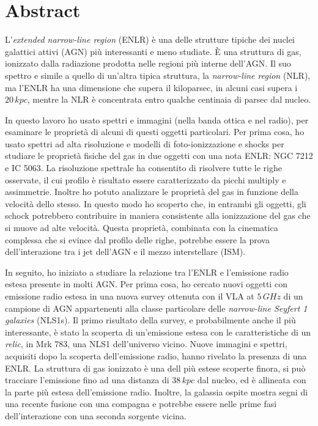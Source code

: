 \documentclass[../main.tex]{subfiles}
\begin{document}
\clearpage

\chapter*{Abstract}

L'\emph{extended narrow-line region} (ENLR) \`e una delle strutture tipiche dei nuclei galattici attivi (AGN) pi\`u interessanti e meno studiate.
\`E una struttura di gas, ionizzato dalla radiazione prodotta nelle regioni pi\`u interne dell'AGN.
Il suo spettro e simile a quello di un'altra tipica struttura, la \emph{narrow-line region} (NLR), ma l'ENLR  ha una dimensione che supera il kiloparsec, in alcuni casi supera i $20\,\si{kpc}$, mentre la NLR \`e concentrata entro qualche centinaia di parsec dal nucleo.

In questo lavoro ho usato spettri e immagini (nella banda ottica e nel radio), per esaminare le propriet\`a di alcuni di questi oggetti particolari.
Per prima cosa, ho usato spettri ad alta risoluzione e modelli di foto-ionizzazione e shocks per studiare le propriet\`a fisiche del gas in due oggetti con una nota ENLR: NGC 7212 e IC 5063.
La risoluzione spettrale ha consentito di risolvere tutte le righe osservate, il cui profilo \`e risultato essere caratterizzato da picchi multiply e assimmetrie.
Inoltre ho potuto analizzare le propriet\`a del gas in funzione della velocit\`a dello stesso.
In questo modo ho scoperto che, in entrambi gli oggetti, gli schock potrebbero contribuire in maniera consistente alla ionizzazione del gas che si muove ad alte velocit\`a.
Questa propriet\`a, combinata con la cinematica complessa che si evince dal profilo delle righe, potrebbe essere la prova dell'interazione tra i jet dell'AGN e il mezzo interstellare (ISM).

In seguito, ho iniziato a studiare la relazione tra l'ENLR e l'emissione radio estesa presente in molti AGN.
Per prima cosa, ho cercato nuovi oggetti con emissione radio estesa in una nuova survey ottenuta con il VLA at $5\,\si{GHz}$ di un campione di AGN appartenenti alla classe particolare delle \emph{narrow-line Seyfert 1 galaxies} (NLS1s).
Il primo risultato della survey, e probabilmente anche il pi\`u interessante, \`e stato la scoperta di un'emissione estesa con le caratteristiche di un \emph{relic}, in Mrk 783, una NLS1 dell'universo vicino.
Nuove immagini e spettri, acquisiti dopo la scoperta dell'emissione radio, hanno rivelato la presenza di una ENLR.
La struttura di gas ionizzato \`e una dell pi\`u estese scoperte finora, si pu\`o tracciare l'emissione fino ad una distanza di $38\,\si{kpc}$ dal nucleo, ed \`e allineata con la parte pi\`u estesa dell'emissione radio.
Inoltre, la galassia ospite mostra segni di una recente fusione con una compagna e potrebbe essere nelle prime fasi dell'interazione con una seconda sorgente vicina.
\end{document}
